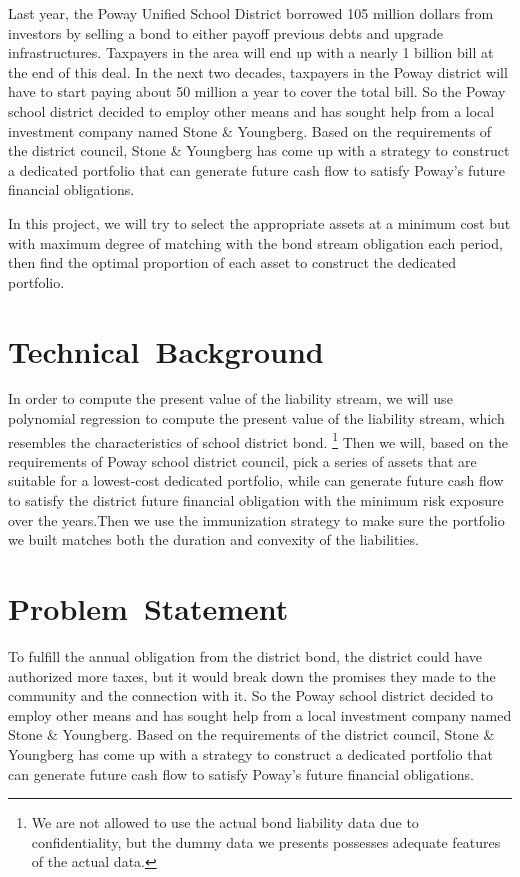 \documentclass[oneside,12pt]{report}
\begin{document}
Last year, the Poway Unified School District borrowed 105 million dollars from investors by selling a bond to either payoff previous debts and upgrade infrastructures. Taxpayers in the area will end up with a nearly 1 billion bill at the end of this deal. In the next two decades, taxpayers in the Poway district will have to start paying about 50 million a year to cover the total bill. So the Poway school district decided to employ other means and has sought help from a local investment company named Stone \& Youngberg.  Based on the requirements of the district  council, Stone \& Youngberg has come up with a strategy to construct a dedicated portfolio that can generate future cash flow to satisfy Poway's future financial obligations. 

In this project, we will try to select the appropriate assets at a minimum cost but with maximum degree of matching with the bond stream obligation each period, then find the optimal proportion of each asset to construct the dedicated portfolio.

\chapter{Technical~Background}\label{}
%
In order to compute the present value of the liability stream, we will use polynomial regression to compute the present value of the liability stream, which resembles the characteristics of school district bond. 
\footnote{We are not allowed to use the actual bond liability data due to confidentiality, but the dummy data we presents possesses adequate features of the actual data.}
Then we will, based on the requirements of Poway school district council, pick a series of assets that are suitable for a lowest-cost dedicated portfolio, while can generate future cash flow to satisfy the  district future financial obligation with the minimum risk exposure over the years.Then we use the immunization strategy to make sure the portfolio we built matches both the duration and convexity of the liabilities.

\chapter{Problem~Statement}\label{}
%
To fulfill the annual obligation from the district bond, the district could have authorized more taxes, but it would break down the promises they made to the community and the connection with it. So the Poway school district decided to employ other means and has sought help from a local investment company named Stone \& Youngberg.  Based on the requirements of the district  council, Stone \& Youngberg has come up with a strategy to construct a dedicated portfolio that can generate future cash flow to satisfy Poway's future financial obligations. 
\end{document}
